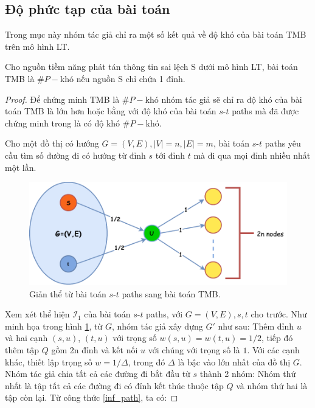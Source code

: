 \subsection{Độ phức tạp của bài toán}		
Trong mục này nhóm tác giả chỉ ra một số kết quả về độ khó của bài toán TMB trên mô hình LT.
\begin{theo}
	Cho nguồn tiềm năng phát tán thông tin sai lệch S dưới mô hình LT, bài toán TMB là $\#P-\text{khó}$ nếu nguồn S chỉ chứa 1 đỉnh.
\end{theo}
\begin{proof}
	Để chứng minh TMB là $\#P-\text{khó}$ nhóm tác giả sẽ chỉ ra độ khó của bài toán TMB là lớn hơn hoặc bằng với độ khó của bài toán $s$-$t$ paths mà đã được chứng minh trong \cite{vali} là có độ khó $\#P-\text{khó}$. 
	\begin{define}
		Cho một đồ thị có hướng $G = (V, E), |V| = n, |E| = m$, bài toán $s$-$t$ paths yêu cầu tìm số đường đi có hướng từ đỉnh $s$ tới đỉnh $t$ mà đi qua mọi đỉnh nhiều nhất một lần. 
	\end{define}			
	\begin{figure}[H]
		\begin{center}
			\includegraphics[height = 5 cm]{picture/reduce}
			\caption{Giản thể từ bài toán $s$-$t$ paths sang bài toán TMB.}
			\label{reduce}   
		\end{center}
	\end{figure}			
	Xem xét thể hiện $\mathcal{I}_1$ của bài toán $s$-$t$ paths, với $G = (V, E), s, t$ cho trước. Như minh họa trong hình \ref{reduce}, từ $G$, nhóm tác giả xây dựng $G'$ như sau: Thêm đỉnh $u$ và hai cạnh $(s, u)$, $(t, u)$ với trọng số $w(s, u) = w(t,u) = 1/2$, tiếp đó thêm tập $Q$ gồm 2n đỉnh và kết nối $u$ với chúng với trọng số là $1$. Với các cạnh khác, thiết lập trọng số $w = 1/\Delta$, trong đó $\Delta$ là bậc vào lớn nhất của đồ thị $G$. Nhóm tác giả chia tất cả các đường đi bắt đầu từ $s$ thành 2 nhóm: Nhóm thứ nhất là tập tất cả các đường đi có đỉnh kết thúc thuộc tập $Q$ và nhóm thứ hai là tập còn lại. Từ công thức \eqref{inf_path}, ta có: 

\end{proof}
